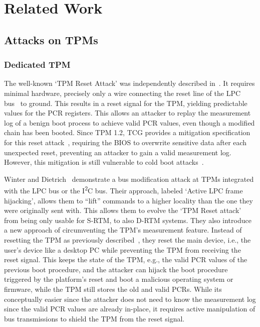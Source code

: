 
\chapter{Related Work}\label{chapter:related_work}

\section{Attacks on TPMs}

\subsection{Dedicated TPM}

The well-known `TPM Reset Attack' was independently described in~\cite{kauerBernhard,sparks2007}. It requires minimal hardware, precisely only a wire connecting the reset line of the LPC bus~\cite{lpc} to ground. This results in a reset signal for the TPM, yielding predictable values for the \ac{PCR} registers. This allows an attacker to replay the measurement log of a benign boot process to achieve valid \ac{PCR} values, even though a modified chain has been booted.
Since TPM 1.2, TCG provides a mitigation specification for this reset attack~\cite{tcgResetFix}, requiring the BIOS to overwrite sensitive data after each unexpected reset, preventing an attacker to gain a valid measurement log.
However, this mitigation is still vulnerable to cold boot attacks~\cite{Halderman2009, Winter2013}.

Winter and Dietrich~\cite{Winter2013} demonstrate a bus modification attack at TPMs integrated with the LPC bus or the I\textsuperscript{2}C bus.
Their approach, labeled `Active LPC frame hijacking', allows them to ``lift'' commands to a higher locality than the one they were originally sent with. This allows them to evolve the `TPM Reset attack' from being only usable for S-RTM, to also D-RTM systems.
They also introduce a new approach of circumventing the TPM's measurement feature. Instead of resetting the TPM as previously described~\cite{kauerBernhard,sparks2007}, they reset the main device, i.e., the user's device like a desktop PC while preventing the TPM from receiving the reset signal. This keeps the state of the TPM, e.g., the valid \ac{PCR} values of the previous boot procedure, and the attacker can hijack the boot procedure triggered by the platform's reset and boot a malicious operating system or firmware, while the TPM still stores the old and valid PCRs. While its conceptually easier since the attacker does not need to know the measurement log since the valid \ac{PCR} values are already in-place, it requires active manipulation of bus transmissions to shield the TPM from the reset signal.

